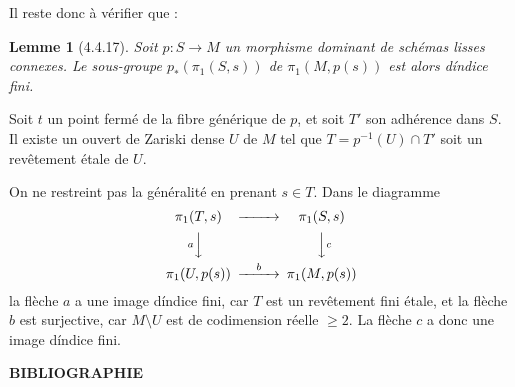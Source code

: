 \documentclass[11pt]{amsart}
\theoremstyle{plain}
\newtheorem{lem}[cor]{Lemme}
\theoremstyle{remark}
\begin{document}
Il reste donc \`a v\'erifier que :

\begin{lem}[4.4.17]
Soit $p : S \to M$ un morphisme dominant de sch\'emas lisses connexes. Le sous-groupe
$p_{*}(\pi_{1}(S,s))$ de $\pi_{1}(M, p(s))$ est alors d\'indice fini.
\end{lem}

Soit $t$ un point ferm\'e de la fibre g\'en\'erique de $p$, et soit $T'$ son adh\'erence dans $S$.
Il existe un ouvert de Zariski dense $U$ de $M$ tel que $T = p^{-1}(U) \cap T'$ soit un
rev\^etement \'etale de $U$.

On ne restreint pas la g\'en\'eralit\'e en prenant $s \in T$. Dans le diagramme
\[
\begin{CD}
\pi_{1}(T,s) @>>> \pi_{1}(S,s) \\
@V{a}VV @VV{c}V \\
\pi_{1}(U, p(s)) @>{b}>> \pi_{1}(M, p(s))
\end{CD}
\]
la fl\`eche $a$ a une image d\'indice fini, car $T$ est un rev\^etement fini \'etale, et la fl\`eche
$b$ est surjective, car $M \setminus U$ est de codimension r\'eelle $\geq 2$. La fl\`eche $c$ a donc une
image d\'indice fini.


    \bigskip
    \begin{center}
    \textbf{BIBLIOGRAPHIE}
    \end{center}
\end{document}
